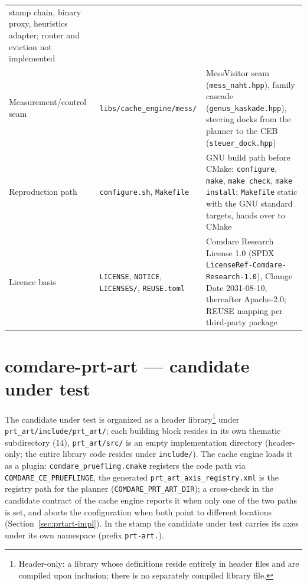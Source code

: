 {\begin{longtable}{@{}>{\raggedright\arraybackslash}p{}>{\raggedright\arraybackslash}p{}>{\raggedright\arraybackslash}p{}@{}}
stamp chain, binary proxy, heuristics adapter; router and eviction not implemented \\
Measurement/\allowbreak{}control seam &
\texttt{libs/\allowbreak{}cache\_engine/\allowbreak{}mess/} &
MessVisitor seam (\texttt{mess\_\allowbreak{}naht.hpp}), family cascade
(\texttt{genus\_\allowbreak{}kaskade.hpp}), steering docks from the planner to the CEB
(\texttt{steuer\_\allowbreak{}dock.hpp}) \\
Reproduction path &
\texttt{configure.sh}, \texttt{Makefile} &
GNU build path before CMake: \texttt{configure}, \texttt{make}, \texttt{make check}, \texttt{make install};
\texttt{Makefile} static with the GNU standard targets, hands over to CMake \\
Licence basis &
\texttt{LICENSE}, \texttt{NOTICE}, \texttt{LICENSES/}, \texttt{REUSE.toml} &
Comdare Research License 1.0 (SPDX \texttt{LicenseRef-\allowbreak{}Comdare-\allowbreak{}Research-1.0}),
Change Date 2031-08-10, thereafter Apache-2.0; REUSE mapping per third-party package \\
\end{longtable}
}

\section*{comdare-prt-art --- candidate under test}

The candidate under test is organized as a header library\footnote{Header-only: a library whose definitions reside
entirely in header files and are compiled upon inclusion; there is no separately compiled library
file.} under \texttt{prt\_art/\allowbreak{}include/\allowbreak{}prt\_art/}; each building block
resides in its own thematic subdirectory (14), \texttt{prt\_art/src/} is an empty
implementation directory (header-only; the entire library code resides under \texttt{include/}). The cache engine loads it as a plugin: \texttt{comdare\_pruefling.cmake} registers
the code path via \texttt{COMDARE\_CE\_PRUEFLINGE}, the generated \texttt{prt\_art\_axis\_registry.xml} is
the registry path for the planner (\texttt{COMDARE\_PRT\_ART\_DIR}); a cross-check in the candidate contract
of the cache engine reports it when only one of the two paths is set, and aborts the configuration
when both point to different locations (Section~\ref{sec:prtart-impl}). In the stamp the candidate under test carries
its axes under its own namespace (prefix \texttt{prt-art.}).

